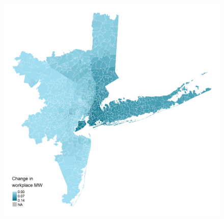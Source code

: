 \documentclass[aspectratio=169, t]{beamer}
\begin{document}
\begin{frame}[label = nyc_example]
\begin{columns}
\begin{column}{0.50\textwidth}
\begin{figure}
                \includegraphics[scale = 0.36]{maps_events/output/nyc2018-12_wkp_mw.png}
            \end{figure}   
        \end{column}
    \end{columns}
    \hyperlink{chi_example}{}
\end{frame}
\end{document}
